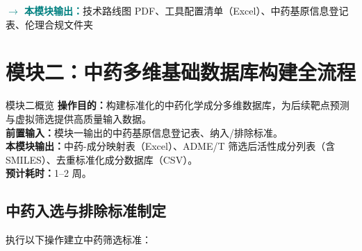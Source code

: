 \documentclass[12pt,a4paper,twoside]{article}
\newcommand{\moduleoutput}[1]{\par\vspace{6pt}\noindent\textcolor{teal}{\textbf{$\rightarrow$ 本模块输出：}}#1\vspace{6pt}}
\begin{document}
\moduleoutput{技术路线图 PDF、工具配置清单（Excel）、中药基原信息登记表、伦理合规文件夹}

\section{模块二：中药多维基础数据库构建全流程}
\label{sec:module2}

\begin{infobox}{模块二概览}
\textbf{操作目的：}构建标准化的中药化学成分多维数据库，为后续靶点预测与虚拟筛选提供高质量输入数据。\\
\textbf{前置输入：}模块一输出的中药基原信息登记表、纳入/排除标准。\\
\textbf{本模块输出：}中药-成分映射表（Excel）、ADME/T 筛选后活性成分列表（含 SMILES）、去重标准化成分数据库（CSV）。\\
\textbf{预计耗时：}1--2 周。
\end{infobox}

\subsection{中药入选与排除标准制定}
\label{sec:module2_selection}

执行以下操作建立中药筛选标准：
\end{document}
